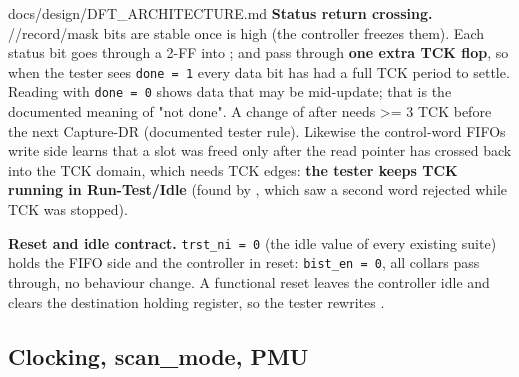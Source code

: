 \begin{relocated}{docs/design/DFT_ARCHITECTURE.md}
\textbf{Status return crossing.}
//\allowbreak{}record/\allowbreak{}mask bits are
stable once  is high (the controller freezes them). Each
status bit goes through a 2-FF  into ;
 and  pass through \textbf{one extra TCK flop}, so
when the tester sees \texttt{done\ =\allowbreak{}\ 1} every data bit has
had a full TCK period to settle. Reading with
\texttt{done\ =\allowbreak{}\ 0} shows data that may be mid-update; that
is the documented meaning of "not done". A change of  after
 needs \textgreater= 3 TCK before the next Capture-DR
(documented tester rule). Likewise the control-word
FIFO\textquotesingle s write side learns that a slot was freed only
after the read pointer has crossed back into the TCK domain, which needs
TCK edges: \textbf{the tester keeps TCK running in
Run-Test/\allowbreak{}Idle} (found by
, which saw a second word
rejected while TCK was stopped).

\textbf{Reset and idle contract.}
\texttt{trst\_\allowbreak{}ni\ =\allowbreak{}\ 0} (the idle value of
every existing suite) holds the FIFO side and the controller in reset:
\texttt{bist\_\allowbreak{}en\ =\allowbreak{}\ 0}, all collars pass
through, no behaviour change. A functional reset leaves the controller
idle and clears the destination holding register, so the tester rewrites
.

\subsection{\texorpdfstring{Clocking, scan\_\allowbreak{}mode,
PMU}{Clocking, scan\_mode, PMU}}\label{tm:ch:dft-architecture:166-clocking-scan-mode-pmu}


\end{relocated}
